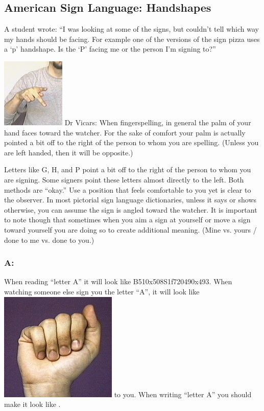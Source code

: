 \documentclass{article}
\begin{document}
\subsection{American Sign Language: Handshapes}

A student wrote:
``I was looking at some of the signs, but couldn't tell which way my hands should be facing.
For example one of the versions of the sign pizza uses a `p' handshape.
Is the `P' facing me or the person I'm signing to?''

\includegraphics[scale=0.5]{images/handsh1.jpg}
Dr Vicars:
When fingerspelling, in general the palm of your hand faces toward the watcher.
For the sake of comfort your palm is actually pointed a bit off to the right of the person to whom you are spelling.
(Unless you are left handed, then it will be opposite.)

Letters like G, H, and P point a bit off to the right of the person to whom you are signing.
Some signers point these letters almost directly to the left.
Both methods are ``okay.''
Use a position that feels comfortable to you yet is clear to the observer.
In most pictorial sign language dictionaries, unless it says or shows otherwise, you can assume the sign is angled toward the watcher.
It is important to note though that sometimes when you aim a sign at yourself or move a sign toward yourself you are doing so to create additional meaning.
(Mine vs. yours / done to me vs. done to you.)

\subsubsection{A:}

When reading ``letter A'' it will look like B510x508S1f720490x493.
When watching someone else sign you the letter ``A'', it will look like \includegraphics[scale=0.5]{images/a.jpg} to you.
When writing ``letter A'' you should make it look like .
\end{document}
